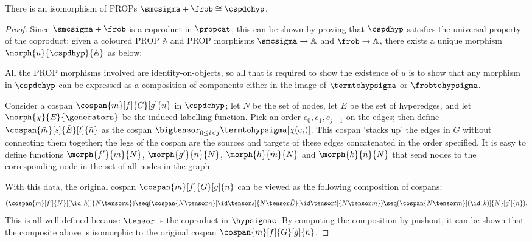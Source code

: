 \begin{theorem}
    \label{thm:isomorphism-smcfrob-cospans}
    There is an isomorphism of PROPs \(\smcsigma + \frob \cong \cspdchyp\).
\end{theorem}
\begin{proof}
    Since \(\smcsigma + \frob\) is a coproduct in \(\propcat\), this can be
    shown by proving that \(\cspdhyp\) satisfies the universal property of the
    coproduct: given a coloured PROP \(\mathbb{A}\) and PROP morphisms
    \(\smcsigma \to \mathbb{A}\) and \(\frob \to \mathbb{A}\), there exists
    a unique morphism \(\morph{u}{\cspdhyp}{\mathbb{A}}\) as below:
    \begin{center}
        
    \end{center}
    All the PROP morphisms involved are identity-on-objects, so all that is
    required to show the existence of \(u\) is to show that any morphism in
    \(\cspdchyp\) can be expressed as a composition of components either in the
    image of \(\termtohypsigma\) or \(\frobtohypsigma\).

    Consider a cospan \(\cospan{m}[f]{G}[g]{n}\) in \(\cspdchyp\); let \(N\) be
    the set of nodes, let \(E\) be the set of hyperedges, and let
    \(\morph{\chi}{E}{\generators}\) be the induced labelling function.
    Pick an order \(e_0, e_1, e_{j-1}\) on the edges; then define \(
    \cospan{\tilde{m}}[s]{\tilde{E}}[t]{\tilde{n}}
    \) as the cospan \(
    \bigtensor_{0 \leq i < j}
    \termtohypsigma[\chi(e_i)]
    \).
    This cospan `stacks up' the edges in \(G\) without connecting them together;
    the legs of the cospan are the sources and targets of these
    edges concatenated in the order specified.
    It is easy to define functions \(\morph{f^\prime}{m}{N}\),
    \(\morph{g^\prime}{n}{N}\), \(\morph{h}{\tilde{m}}{N}\) and
    \(\morph{k}{\tilde{n}}{N}\) that send nodes to the corresponding node in the
    set of all nodes in the graph.

    With this data, the original cospan \(\cospan{m}[f]{G}[g]{n}\) can be
    viewed as the following composition of cospans: \[
        (
        \cospan{m}[f^\prime]{N}[(\id,h)]{N \tensor \tilde{n}}
        ) \seq (
        \cospan{
            N \tensor \tilde{n}
        }[
            \id \tensor s
        ]{
            N \tensor \tilde{E}
        }[
            \id \tensor t
        ]{
            N \tensor \tilde{m}
        }
        ) \seq (
        \cospan{N \tensor \tilde{m}}[(\id, k)]{N}[g^\prime]{n}
        ).
    \]
    This is all well-defined because \(\tensor\) is the coproduct in
    \(\hypsigmac\).
    By computing the composition by pushout, it can be shown that the composite
    above is isomorphic to the original cospan \(\cospan{m}[f]{G}[g]{n}\).


\end{proof}

